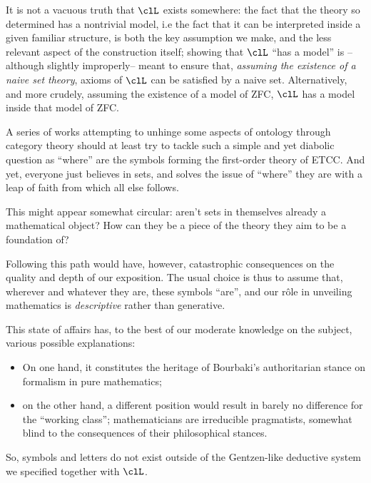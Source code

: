 It is not a vacuous truth that $\clL$ exists somewhere: the fact that the theory so determined has a nontrivial model, i.e the fact that it can be interpreted inside a given familiar structure, is both the key assumption we make, and the less relevant aspect of the construction itself; showing that $\clL$ ``has a model'' is --although slightly improperly-- meant to ensure that, \emph{assuming the existence of a naive set theory}, axioms of $\clL$ can be satisfied by a naive set. Alternatively, and more crudely, assuming the existence of a model of ZFC, $\clL$ has a model inside that model of ZFC.

A series of works attempting to unhinge some aspects of ontology through category theory should at least try to tackle such a simple and yet diabolic question as ``where'' are the symbols forming the first-order theory of ETCC. And yet, everyone just believes in sets, and solves the issue of ``where'' they are with a leap of faith from which all else follows.

This might appear somewhat circular: aren't sets in themselves already a mathematical object? How can they be a piece of the theory they aim to be a foundation of?

Following this path would have, however, catastrophic consequences on the quality and depth of our exposition. The usual choice is thus to assume that, wherever and whatever they are, these symbols ``are'', and our r\^ole in unveiling mathematics is \emph{descriptive} rather than generative.

This state of affairs has, to the best of our moderate knowledge on the subject, various possible explanations:
\begin{itemize}
	\item On one hand, it constitutes the heritage of Bourbaki's authoritarian stance on formalism in pure mathematics;
	\item on the other hand, a different position would result in barely no difference for the ``working class''; mathematicians are irreducible pragmatists, somewhat blind to the consequences of their philosophical stances.
\end{itemize}
So, symbols and letters do not exist outside of the Gentzen-like deductive system we specified together with $\clL$.


